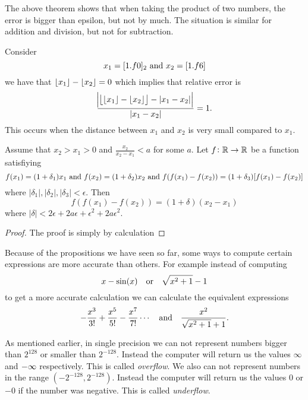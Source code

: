 \documentclass[11pt,a4paper]{article}
\begin{document}
The above theorem shows that when taking the product of two numbers,
the error is bigger than epsilon, but not by much.
The situation is similar for addition and division,
but not for subtraction.

Consider
\[
  x_1 = [1.f0]_2 \text{ and } x_2 = [1.f6]
\]
we have that $\left\lfloor x_1 \right\rfloor - \left\lfloor x_2 \right\rfloor = 0$ which implies that
relative error is
\[
  \frac{\abs{\left\lfloor \left\lfloor x_1 \right\rfloor - \left\lfloor x_2 \right\rfloor \right\rfloor - |x_1 - x_2|}}{|x_1 - x_2|} = 1.
\]
This occurs when the distance between $x_1$ and $x_2$ is very small compared
to $x_1$.

\begin{proposition}
  Assume that $x_2 > x_1 > 0$ and $\frac{x_2}{x_2 - x_1} < a$ for some $a$.
  Let $f \colon \mathbb{R} \to \mathbb{R}$ be a function satisfiying
  \[
    f(x_1) = (1 + \delta_1) x_1 \text{ and }
    f(x_2) = (1 + \delta_2) x_2 \text{ and }
    f(f(x_1) - f(x_2)) = (1 + \delta_3)[f(x_1) - f(x_2)]
  \]
  where $|\delta_1|, |\delta_2|, |\delta_3| < \epsilon$.
  Then
  \[
    f(f(x_1) - f(x_2)) = (1 + \delta)(x_2 - x_1)
  \]
  where $|\delta| < 2 \epsilon + 2 a \epsilon + \epsilon^2 + 2 a \epsilon^2$.
\end{proposition}
\begin{proof}
  The proof is simply by calculation
\end{proof}

Because of the propositions we have seen so far, some ways to compute
certain expressions are more accurate than others.
For example instead of computing
\[
  x - \sin(x) \quad \text{or} \quad
  \sqrt{x^2 + 1} - 1
\]
to get a more accurate calculation we can calculate the equivalent
expressions
\[
  - \frac{x^3}{3!} + \frac{x^5}{5!} - \frac{x^7}{7!} \cdots
  \quad \text{and} \quad
  \frac{x^2}{\sqrt{x^2 + 1} + 1}.
\]

As mentioned earlier, in single precision we can not represent numbers bigger
than $2^{128}$ or smaller than $2^{-128}$.
Instead the computer will return us the values $\infty$ and $-\infty$ 
respectively. This is called \emph{overflow}.
We also can not represent numbers in the range $(-2^{-128}, 2^{-128})$.
Instead the computer will return us the values $0$ or $-0$ if the number
was negative. This is called \emph{underflow}.
\end{document}
